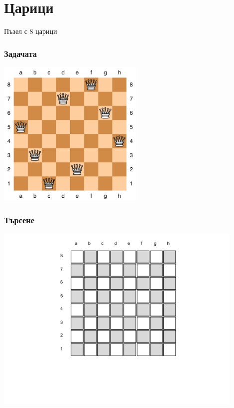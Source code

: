 \documentclass{beamer}
\begin{document}
\section{Царици}

\begin{frame}
\centerline{Пъзел с 8 царици}
\end{frame}

\begin{frame}[fragile]
\frametitle{Задачата}
\begin{center}
\includegraphics[width=7cm]{images/puzzle}
\end{center}
\end{frame}



\begin{frame}[fragile]
\frametitle{Търсене}
\begin{center}
\includegraphics[width=12cm]{images/cb_00}
\end{center}
\end{frame}
\end{document}
